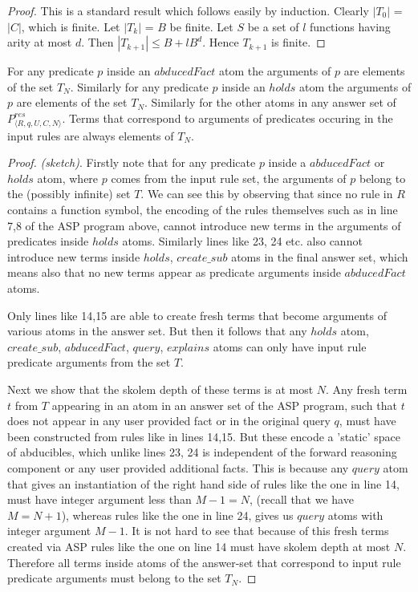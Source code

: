 \begin{proof}
This is a standard result which follows easily by induction. Clearly $|T_{0}|$ = $|C|$, which is finite. Let $|T_{k}|$ = $B$ be finite. Let $S$ be a set of $l$ functions having arity at most $d$. Then $|T_{k+1}|\leq B + lB^{d}$. Hence $T_{k+1}$ is finite.  
\end{proof}

\begin{lemma}
 For any predicate $p$ inside an $abducedFact$ atom the arguments of $p$ are elements of the set $T_{N}$. Similarly for any predicate $p$ inside an $holds$ atom the arguments of $p$ are elements of the set $T_{N}$. Similarly for the other atoms in any answer set of $P_{\langle R,q,U,C,N \rangle}^{res}$. Terms that correspond to arguments of predicates occuring in the input rules are always elements of $T_{N}$.
\end{lemma}

\begin{proof}\textit{(sketch)}. Firstly note that for any predicate $p$ inside a
$abducedFact$ or $holds$ atom, where $p$ comes from the input rule set, the
arguments of $p$ belong to the (possibly infinite) set $T$. We can see this by observing that
since no rule in $R$ contains a function symbol, the encoding of the rules
themselves such as in line 7,8 of the ASP program above, cannot introduce new
terms in the arguments of predicates inside $holds$ atoms. Similarly lines
like 23, 24 etc. also cannot introduce new terms inside $holds$, $create\_sub$
atoms in the final answer set, which means also that no new terms appear as
predicate arguments inside $abducedFact$ atoms.

Only lines like 14,15 are able to create fresh terms that become arguments of
various atoms in the answer set. But then it follows that any $holds$ atom,
$create\_sub$, $abducedFact$, $query$, $explains$ atoms can only have input
rule predicate arguments from the set $T$.

Next we show that the skolem depth of these terms is at most $N$. Any fresh
term $t$ from $T$ appearing in an atom in an answer set of the ASP program,
such that $t$ does not appear in any user provided fact or in the original
query $q$, must have been constructed from rules like in lines 14,15. But
these encode a 'static' space of abducibles, which unlike lines 23, 24 is
independent of the forward reasoning component or any user provided additional
facts. This is because any $query$ atom that gives an instantiation of the
right hand side of rules like the one in line 14, must have integer argument
less than $M-1=N$, (recall that we have $M=N+1$), whereas rules like the one
in line 24, gives us $query$ atoms with integer argument $M-1$. It is not hard
to see that because of this fresh terms created via ASP rules like the one on
line 14 must have skolem depth at most $N$. Therefore all terms inside atoms
of the answer-set that correspond to input rule predicate arguments must
belong to the set $T_{N}$.
\end{proof}


